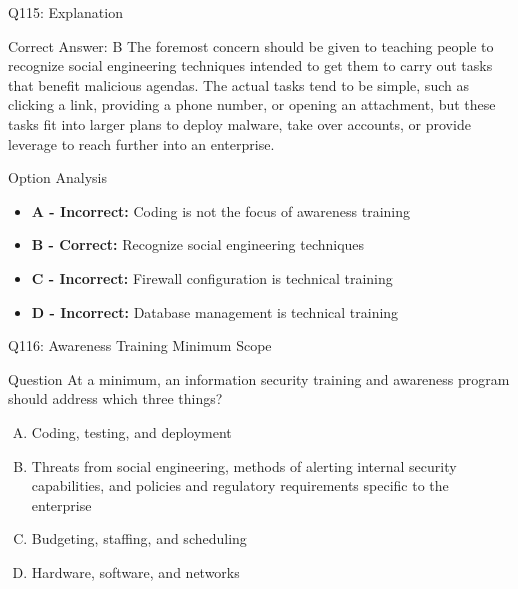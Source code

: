 \documentclass{beamer}
\begin{document}
	\begin{frame}{Q115: Explanation}
		\begin{block}{Correct Answer: B}
			The foremost concern should be given to teaching people to recognize social engineering techniques intended to get them to carry out tasks that benefit malicious agendas. The actual tasks tend to be simple, such as clicking a link, providing a phone number, or opening an attachment, but these tasks fit into larger plans to deploy malware, take over accounts, or provide leverage to reach further into an enterprise.
		\end{block}
		\begin{block}{Option Analysis}
			\begin{itemize}
				\item \textbf{A - Incorrect:} Coding is not the focus of awareness training
				\item \textbf{B - Correct:} Recognize social engineering techniques
				\item \textbf{C - Incorrect:} Firewall configuration is technical training
				\item \textbf{D - Incorrect:} Database management is technical training
			\end{itemize}
		\end{block}
	\end{frame}
	
	\begin{frame}{Q116: Awareness Training Minimum Scope}
		\begin{block}{Question}
			At a minimum, an information security training and awareness program should address which three things?
		\end{block}
		\begin{enumerate}[(A)]
			\item Coding, testing, and deployment
			\item Threats from social engineering, methods of alerting internal security capabilities, and policies and regulatory requirements specific to the enterprise
			\item Budgeting, staffing, and scheduling
			\item Hardware, software, and networks
		\end{enumerate}
	\end{frame}
	
\end{document}
